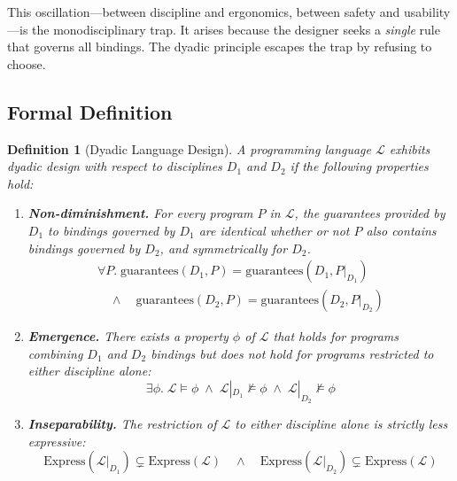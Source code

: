 \documentclass[11pt,a4paper]{article}
\newtheorem{definition}[theorem]{Definition}
\begin{document}
This oscillation---between discipline and ergonomics, between safety and
usability---is the monodisciplinary trap. It arises because the designer
seeks a \emph{single} rule that governs all bindings. The dyadic principle
escapes the trap by refusing to choose.

\subsection{Formal Definition}

\begin{definition}[Dyadic Language Design]
\label{def:dyadic}
A programming language $\mathcal{L}$ exhibits \emph{dyadic design} with respect
to disciplines $D_1$ and $D_2$ if the following properties hold:

\begin{enumerate}[label=(D\arabic*)]
  \item \label{prop:nondiminishment}
    \textbf{Non-diminishment.} For every program $P$ in $\mathcal{L}$, the
    guarantees provided by $D_1$ to bindings governed by $D_1$ are identical
    whether or not $P$ also contains bindings governed by $D_2$, and
    symmetrically for $D_2$.
    \begin{multline*}
      \forall P.\; \text{guarantees}(D_1, P) = \text{guarantees}(D_1, P|_{D_1}) \\
      \quad \wedge \quad
      \text{guarantees}(D_2, P) = \text{guarantees}(D_2, P|_{D_2})
    \end{multline*}

  \item \label{prop:emergence}
    \textbf{Emergence.} There exists a property $\phi$ of $\mathcal{L}$ that
    holds for programs combining $D_1$ and $D_2$ bindings but does not hold
    for programs restricted to either discipline alone:
    \[
      \exists \phi.\; \mathcal{L} \models \phi
      \;\wedge\;
      \mathcal{L}|_{D_1} \not\models \phi
      \;\wedge\;
      \mathcal{L}|_{D_2} \not\models \phi
    \]

  \item \label{prop:inseparability}
    \textbf{Inseparability.} The restriction of $\mathcal{L}$ to either
    discipline alone is strictly less expressive:
    \[
      \text{Express}(\mathcal{L}|_{D_1}) \subsetneq \text{Express}(\mathcal{L})
      \quad \wedge \quad
      \text{Express}(\mathcal{L}|_{D_2}) \subsetneq \text{Express}(\mathcal{L})
    \]
\end{enumerate}
\end{definition}
\end{document}
